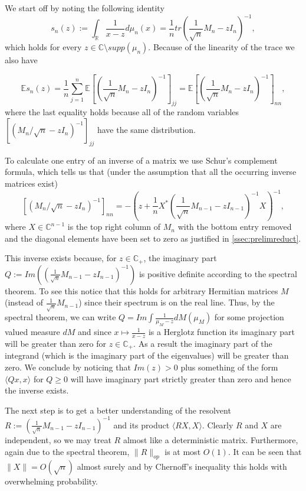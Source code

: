 We start off by noting the following identity $$s_n(z) := \int_\mathbb{R}\frac{1}{x-z}d\mu_n(x) = \frac{1}{n}tr\left(\frac{1}{\sqrt n}M_n-zI_n\right)^{-1},$$ which holds for every $z\in\mathbb C\setminus supp(\mu_n)$. Because of the linearity of the trace we also have

\begin{equation}\label{eq:schursComplementForEs}
	\mathbb Es_n(z) = \frac{1}{n}\sum_{j=1}^n\mathbb E\left[\left(\frac{1}{\sqrt n}M_n-zI_n\right)^{-1}\right]_{jj}=\mathbb E\left[\left(\frac{1}{\sqrt n}M_n-zI_n\right)^{-1}\right]_{nn},
\end{equation}
where the last equality holds because all of the random variables \newline$\left[(M_n/\sqrt n-zI_n)^{-1}\right]_{jj}$ have the same distribution.

To calculate one entry of an inverse of a matrix we use Schur's complement formula, which tells us that (under the assumption that all the occurring inverse matrices exist) $$[(M_n/\sqrt n-zI_n)^{-1}]_{nn}=-\left(z+\frac{1}{n}X^*(\frac{1}{\sqrt n}M_{n-1}-zI_{n-1})^{-1}X\right)^{-1},$$ where $X\in\mathbb C^{n-1}$ is the top right column of $M_n$ with the bottom entry removed and the diagonal elements have been set to zero as justified in \ref{ssec:prelimreduct}.

\begin{remark}
	This inverse exists because, for $z\in\mathbb C_+$, the imaginary part $Q:=Im\left((\frac{1}{\sqrt n}M_{n-1}-zI_{n-1})^{-1}\right)$ is positive definite according to the spectral theorem. To see this notice that this holds for arbitrary Hermitian matrices $M$ (instead of $\frac{1}{\sqrt n}M_{n-1}$) since their spectrum is on the real line. Thus, by the spectral theorem, we can write $Q=Im\int\frac{1}{\mu_M-z}dM(\mu_M)$ for some projection valued measure $dM$ and since $x\mapsto\frac{1}{x-z}$ is a Herglotz function its imaginary part will be greater than zero for $z\in\mathbb C_+$. As a result the imaginary part of the integrand (which is the imaginary part of the eigenvalues) will be greater than zero.
We conclude by noticing that $Im(z)>0$ plus something of the form $\langle Qx,x\rangle$ for $Q\geq 0$ will have imaginary part strictly greater than zero and hence the inverse exists.
\end{remark}

The next step is to get a better understanding of the resolvent $R:=(\frac{1}{\sqrt n}M_{n-1}-zI_{n-1})^{-1}$ and its product $\langle RX,X\rangle$. Clearly $R$ and $X$ are independent, so we may treat $R$ almost like a deterministic matrix. Furthermore, again due to the spectral theorem, $\|R\|_{op}$ is at most $O(1)$. It can be seen that $\|X\|=O(\sqrt n)$ almost surely and by Chernoff's inequality this holds with overwhelming probability.

